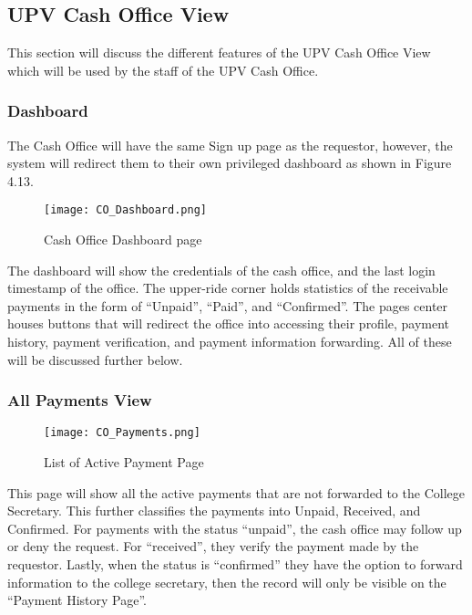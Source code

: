 \subsection{UPV Cash Office View}

This section will discuss the different features of the UPV Cash Office View which will be used by the staff of the UPV Cash Office.

\subsubsection{Dashboard}

The Cash Office will have the same Sign up page as the requestor, however, the system will redirect them to their own privileged dashboard as shown in Figure 4.13.
    \begin{figure}[h]
        \centering 
        \begin{minipage}[c]{0.5\linewidth}
            \centering
            \texttt{[image: CO\_Dashboard.png]}
            \caption{Cash Office Dashboard page}
            \label{fig:CO_Dashboard}
        \end{minipage}
    \end{figure}

The dashboard will show the credentials of the cash office, and the last login timestamp of the office. The upper-ride corner holds statistics of the receivable payments in the form of “Unpaid”, “Paid”, and “Confirmed”. The page\textsc{}s center houses buttons that will redirect the office into accessing their profile, payment history, payment verification, and payment information forwarding. All of these will be discussed further below.

\subsubsection{All Payments View}

    \begin{figure}[h]
        \centering 
        \begin{minipage}[c]{0.5\linewidth}
            \centering
            \texttt{[image: CO\_Payments.png]}
            \caption{List of Active Payment Page}
            \label{fig:CO_Payments}
        \end{minipage}
    \end{figure}

This page will show all the active payments that are not forwarded to the College Secretary. This further classifies the payments into Unpaid, Received, and Confirmed. For payments with the status “unpaid”, the cash office may follow up or deny the request. For “received”, they verify the payment made by the requestor. Lastly, when the status is “confirmed”  they have the option to forward information to the college secretary, then the record will only be visible on the “Payment History Page”.

